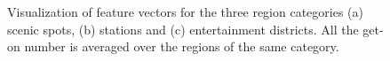 \documentclass[a4paper, 10pt, conference]{ieeeconf}      %
\begin{document}
\begin{figure}
    \centering
    \caption{Visualization of feature vectors for the three region categories (a) scenic spots, (b) stations and (c) entertainment districts. All the get-on number is averaged over the regions of the same category.}
    \label{fig:my_label_3}
\end{figure}
\end{document}
